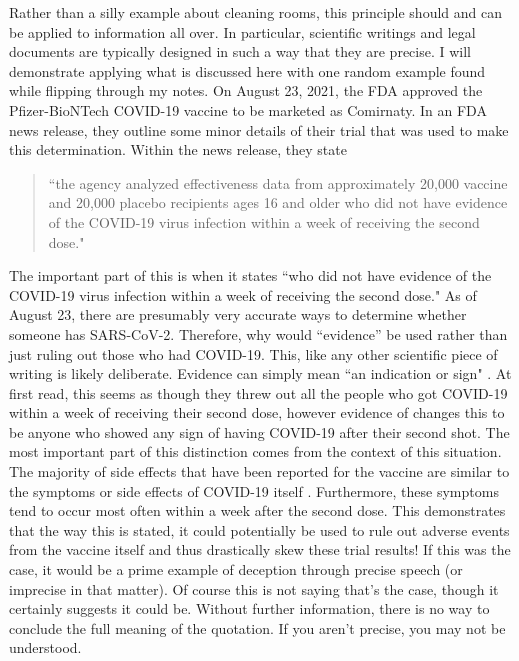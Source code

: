 \documentclass[10pt, a4paper, twocolumn]{book}
\begin{document}
Rather than a silly example about cleaning rooms, this principle should and can be applied to information all over. In particular, scientific writings and legal documents are typically designed in such a way that they are precise. I will demonstrate applying what is discussed here with one random example found while flipping through my notes. On August 23, 2021, the FDA approved the Pfizer-BioNTech COVID-19 vaccine to be marketed as Comirnaty. In an FDA news release, they outline some minor details of their trial that was used to make this determination. Within the news release, they state

\begin{quotation}
	``the agency analyzed effectiveness data from approximately 20,000 vaccine and 20,000 placebo recipients ages 16 and older who did not have evidence of the COVID-19 virus infection within a week of receiving the second dose." \citep{FDAApprovesVaccine}
\end{quotation}

The important part of this is when it states ``who did not have evidence of the COVID-19 virus infection within a week of receiving the second dose." As of August 23, there are presumably very accurate ways to determine whether someone has SARS-CoV-2. Therefore, why would ``evidence'' be used rather than just ruling out those who had COVID-19. This, like any other scientific piece of writing is likely deliberate. Evidence can simply mean ``an indication or sign" \citep{dicionary}. At first read, this seems as though they threw out all the people who got COVID-19 within a week of receiving their second dose, however evidence of changes this to be anyone who showed any sign of having COVID-19 after their second shot. The most important part of this distinction comes from the context of this situation. The majority of side effects that have been reported for the vaccine are similar to the symptoms or side effects of COVID-19 itself \citep{ComirnatyFactSheet}. Furthermore, these symptoms tend to occur most often within a week after the second dose. This demonstrates that the way this is stated, it could potentially be used to rule out adverse events from the vaccine itself and thus drastically skew these trial results! If this was the case, it would be a prime example of deception through precise speech (or imprecise in that matter). Of course this is not saying that's the case, though it certainly suggests it could be. Without further information, there is no way to conclude the full meaning of the quotation. If you aren't precise, you may not be understood. 
\end{document}

